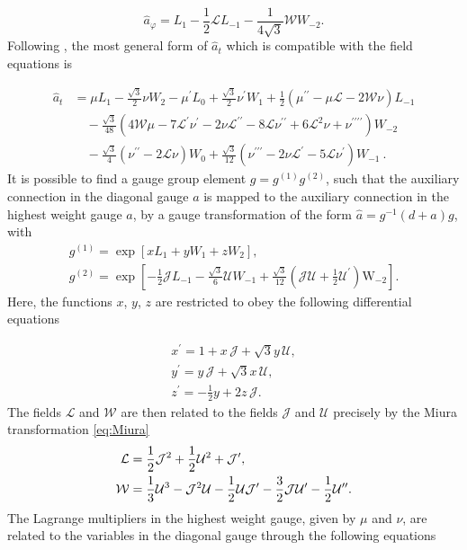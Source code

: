 \documentclass[letterpaper,11pt,oneside]{book}
\begin{document}
\begin{equation}
	\hat{a}_{\varphi}=L_{1}-\frac{1}{2}\mathcal{L}L_{-1}-\frac{1}{4\sqrt{3}}\mathcal{W}W_{-2}.\label{eq:Auxiliary connection HWg}
\end{equation}
Following \cite{Henneaux:2013dra,Bunster:2014mua}, the most general
form of $\hat{a}_{t}$ which is compatible with the field equations
is

\begin{align}
	\hat{a}_{t} & =\mu L_{1}-\frac{\sqrt{3}}{2}\nu W_{2}-\mu^{\prime}L_{0}+\frac{\sqrt{3}}{2}\nu^{\prime}W_{1}+\frac{1}{2}\left(\mu^{\prime\prime}-\mu\mathcal{L}-2\mathcal{W}\nu\right)L_{-1}\nonumber \\
	& \quad-\frac{\sqrt{3}}{48}\left(4\mathcal{W}\mu-7\mathcal{L}^{\prime}\nu^{\prime}-2\nu\mathcal{L}^{\prime\prime}-8\mathcal{L}\nu^{\prime\prime}+6\mathcal{L}^{2}\nu+\nu^{\prime\prime\prime\prime}\right)W_{-2}\nonumber \\
	& \quad-\frac{\sqrt{3}}{4}\left(\nu^{\prime\prime}-2\mathcal{L}\nu\right)W_{0}+\frac{\sqrt{3}}{12}\left(\nu^{\prime\prime\prime}-2\nu\mathcal{L}^{\prime}-5\mathcal{L}\nu^{\prime}\right)W_{-1}\ .\label{eq:AtHWG}
\end{align}
It is possible to find a gauge group element $g=g^{(1)}g^{(2)}$,
such that the auxiliary connection in the diagonal gauge $a$ is mapped
to the auxiliary connection in the highest weight gauge $\hat{a}$,
by a gauge transformation of the form $\hat{a}=g^{-1}\left(d+a\right)g$,
with
\[
\begin{array}{l}
	g^{(1)}=\exp\left[xL_{1}+yW_{1}+zW_{2}\right],\\
	g^{(2)}=\exp\left[-\frac{1}{2}\mathcal{J}L_{-1}-\frac{\sqrt{3}}{6}\mathcal{U}W_{-1}+\frac{\sqrt{3}}{12}\left(\mathcal{J}\mathcal{U}+\frac{1}{2}\mathcal{U}^{\prime}\right)\mathrm{W}_{-2}\right].
\end{array}
\]
Here, the functions $x$, $y$, $z$ are restricted to obey the following
differential equations

\[
\begin{array}{l}
	x^{\prime}=1+x\,\mathcal{J}+\sqrt{3}y\,\mathcal{U},\\
	y^{\prime}=y\,\mathcal{J}+\sqrt{3}x\,\mathcal{U},\\
	z^{\prime}=-\frac{1}{2}y+2z\,\mathcal{J}.
\end{array}
\]
The fields $\mathcal{L}$ and $\mathcal{W}$ are then related to the
fields $\mathcal{J}$ and $\mathcal{U}$ precisely by the Miura transformation
\eqref{eq:Miura}
\begin{align}
	\mathcal{L} & =\frac{1}{2}{\cal J}^{2}+\frac{1}{2}\mathcal{U}^{2}+{\cal J}^{\prime},\nonumber \\
	\mathcal{W} & =\frac{1}{3}\mathcal{U}^{3}-{\cal J}^{2}\mathcal{U}-\frac{1}{2}\mathcal{U}{\cal J}^{\prime}-\frac{3}{2}{\cal J}{\cal U}^{\prime}-\frac{1}{2}{\cal U}^{\prime\prime}.\label{eq:Miura2}
\end{align}
The Lagrange multipliers in the highest weight gauge, given by $\mu$
and $\nu$, are related to the variables in the diagonal gauge through
the following equations
\end{document}
